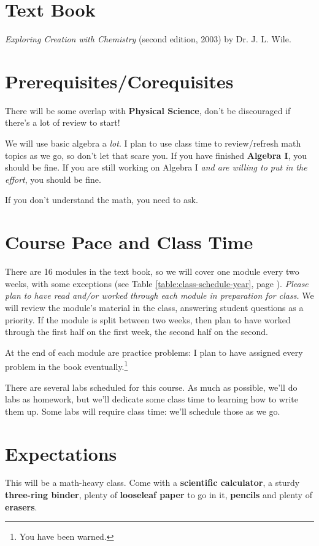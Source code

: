 \documentclass[11pt, oneside]{article}   	%
\begin{document}
\section{Text Book}
 \emph{Exploring Creation with Chemistry} (second edition, 2003) by Dr. J. L. Wile.


\section{Prerequisites/Corequisites}
There will be some overlap with \textbf{Physical Science}, don't be discouraged if there's a lot of review to start!

We will use basic algebra a \emph{lot}. 
I plan to use class time to review/refresh math topics as we go, so don't let that scare you.
If you have finished \textbf{Algebra I}, you should be fine. 
If you are still working on Algebra I \emph{and are willing to put in the effort}, you should be fine.

If you don't understand the math, you need to ask.

\section{Course Pace and Class Time}
There are 16 modules in the text book, so we will cover one module every two weeks, with some exceptions (see Table \ref{table:class-schedule-year}, page \pageref{table:class-schedule-year}). 
\emph{Please plan to have read and/or worked through each module in preparation for class.}  
We will review the module's material in the class, answering student questions as a priority. 
If the module is split between two weeks, then plan to have worked through the first half on the first week, the second half on the second. 

At the end of each module are practice problems: I plan to have assigned every problem in the book eventually.\footnote{You have been warned.}

There are several labs scheduled for this course. As much as possible, we'll do labs as homework, but we'll dedicate some class time to learning how to write them up.
Some labs will require class time: we'll schedule those as we go.

\section{Expectations}
This will be a math-heavy class. 
Come with a \textbf{scientific calculator}, a sturdy \textbf{three-ring binder}, plenty of \textbf{looseleaf paper} to go in it, \textbf{pencils} and plenty of \textbf{erasers}.
\end{document}
